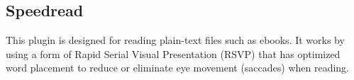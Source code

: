 \subsection{Speedread}

This plugin is designed for reading plain-text files such as
ebooks. It works by using a form of Rapid Serial Visual Presentation
(RSVP) that has optimized word placement to reduce or eliminate eye
movement (saccades) when reading.
